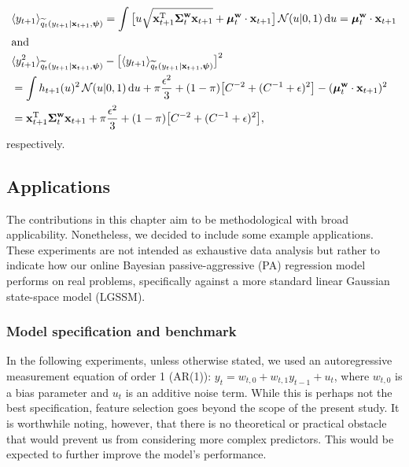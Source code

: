 \begin{align}
	& \langle y_{t+1} \rangle_{\widetilde{q}_{t}(y_{t+1}|\mathbf{x}_{t+1}, \boldsymbol{\psi})}
	= \int \big[u\sqrt{\mathbf{x}_{t+1}^\text{T}\boldsymbol{\Sigma}_{t}^\mathbf{w}\mathbf{x}_{t+1}} + \boldsymbol{\mu}_{t}^\mathbf{w}\cdot\mathbf{x}_{t+1}\big]\,\mathcal{N}(u|0, 1)\,\mathrm{d}u
	= \boldsymbol{\mu}_{t}^\mathbf{w}\cdot\mathbf{x}_{t+1}
	\\
\intertext{and}
	& \langle y_{t+1}^2 \rangle_{\widetilde{q}_{t}(y_{t+1}|\mathbf{x}_{t+1}, \boldsymbol{\psi})}
	- \big[\langle y_{t+1} \rangle_{\widetilde{q}_{t}(y_{t+1}|\mathbf{x}_{t+1}, \boldsymbol{\psi})}\big]^2
	\nonumber \\
	&= \int h_{t+1}(u)^2\,\mathcal{N}(u|0, 1)\,\mathrm{d}u + \pi\frac{\epsilon^2}{3} + (1-\pi)\big[C^{-2} + (C^{-1} + \epsilon)^2\big] - (\boldsymbol{\mu}_{t}^\mathbf{w}\cdot\mathbf{x}_{t+1})^2
	\nonumber \\
	&= \mathbf{x}_{t+1}^\text{T}\boldsymbol{\Sigma}_{t}^\mathbf{w}\mathbf{x}_{t+1} + \pi\frac{\epsilon^2}{3} + (1-\pi)\big[C^{-2} + (C^{-1} + \epsilon)^2\big],
\end{align}
respectively.




\subsection{Applications}

The contributions in this chapter aim to be methodological with broad applicability. Nonetheless, we decided to include some example applications. These experiments are not intended as exhaustive data analysis but rather to indicate how our online Bayesian passive-aggressive (PA) regression model performs on real problems, specifically against a more standard linear Gaussian state-space model (LGSSM).

\subsubsection{Model specification and benchmark}

In the following experiments, unless otherwise stated, we used an autoregressive measurement equation of order 1 (AR(1)): $y_t = w_{t,0} + w_{t,1} y_{t−1} + u_t$, where $w_{t,0}$ is a bias parameter and $u_t$ is an additive noise term. While this is perhaps not the best specification, feature selection goes beyond the scope of the present study. It is worthwhile noting, however, that there is no theoretical or practical obstacle that would prevent us from considering more complex predictors. This would be expected to further improve the model’s performance.

